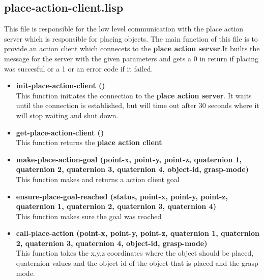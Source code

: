 \documentclass[main.tex]{subfiles}
\begin{document}
		\subsection{place-action-client.lisp}
		This file is responsible for the low level communication with the
		place action server which is responsible for placing objects. The main function of this file is to provide an action client which connecets to the \textbf{place action server}.It builts the message for the server with the given parameters and gets a 0 in return if placing was succesful or a 1  or an error code if it failed. 
	    \begin{itemize}
			\item \textbf{init-place-action-client ()} \\
			This function initiates the connection to the \textbf{place action server}. It waits until the connection is established, but will time out after 30 seconds where it will stop waiting and shut down. 
			\item \textbf{get-place-action-client ()} \\
			This function returns the \textbf{place action client}
			\item \textbf{make-place-action-goal (point-x, point-y, point-z, quaternion 1, quaternion 2, quaternion 3, quaternion 4, object-id, grasp-mode)} \\
			This function makes and returns a action client goal
			\item \textbf{ensure-place-goal-reached (status, point-x, point-y, point-z, quaternion 1, quaternion 2, quaternion 3, quaternion 4)} \\
            This function makes sure the goal was reached
			\item \textbf{call-place-action (point-x, point-y, point-z, quaternion 1, quaternion 2, quaternion 3, quaternion 4, object-id, grasp-mode)} \\
			This function takes the x,y,z coordinates where the object should be placed, quaternion values  and the object-id of the object that is placed and the grasp mode.
		\end{itemize}
\end{document}
